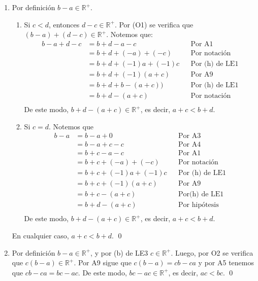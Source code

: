\documentclass[11pt]{article}
\begin{document}
\begin{enumerate}[label=\alph*),font=\bfseries]
    \item Por definición $b-a \in \mathbb{R}^+$.
        \begin{enumerate}[label=\roman*), font=\bfseries]
        \item Si $c<d$, entonces $d-c \in \mathbb{R}^+$. Por (O1) se verifica que $(b-a)+(d-c) \in \mathbb{R}^+$. Notemos que:
        \begin{align*}
        b-a+d-c &= b+d-a-c && \text{Por A1}\\
        &= b+d+(-a)+(-c) && \text{Por notación}\\
        &= b+d+(-1)a+(-1)c && \text{Por (h) de LE1}\\
        &= b+d+ (-1) (a + c) && \text{Por A9}\\
        &= b+d + b-(a+c) \big) && \text{Por (h) de LE1}\\
        &= b+d - (a+c) && \text{Por notación}\\
        \end{align*}
        De este modo, $b+d-(a+c)\in \mathbb{R}^+$, es decir, $a+c<b+d$.
        \item Si $c=d$. Notemos que
        \begin{align*}
        b - a &= b -a + 0 && \text{Por A3}\\
        &= b-a+c-c && \text{Por A4}\\
        &= b+c-a-c && \text{Por A1}\\
        &= b+c+(-a)+(-c) && \text{Por notación}\\
        &= b+c+(-1)a+(-1)c && \text{Por (h) de LE1}\\
        &= b+c+(-1)(a+c) && \text{Por A9}\\
        &= b+c-(a+c) && \text{Por(h) de LE1}\\
        &= b+d-(a+c) && \text{Por hipótesis}\\
        \end{align*}
        De este modo, $b+d-(a+c)\in \mathbb{R}^+$, es decir, $a+c<b+d$.
        \end{enumerate}
        En cualquier caso, $a+c<b+d$. \qed


    \item Por definición $b-a \in \mathbb{R}^+$, y por (b) de LE3 $c \in \mathbb{R}^+$. Luego, por O2 se verifica que $c(b-a) \in \mathbb{R}^+$. Por A9 sigue que $c(b-a)=cb-ca$ y por A5 tenemos que $cb-ca=bc-ac$. De este modo, $bc-ac \in \mathbb{R}^+$, es decir, $ac<bc$.
    \qed


\end{enumerate}
\end{document}

